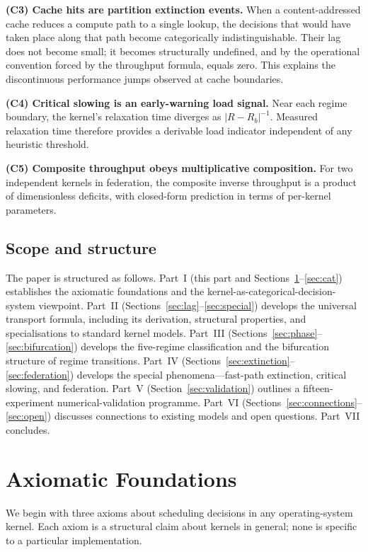 \documentclass[twocolumn,11pt,a4paper]{article}
\newcommand{\Rens}{R}
\begin{document}
\textbf{(C3) Cache hits are partition extinction events.} When a content-addressed cache reduces a compute path to a single lookup, the decisions that would have taken place along that path become categorically indistinguishable. Their lag does not become small; it becomes structurally undefined, and by the operational convention forced by the throughput formula, equals zero. This explains the discontinuous performance jumps observed at cache boundaries.

\textbf{(C4) Critical slowing is an early-warning load signal.} Near each regime boundary, the kernel's relaxation time diverges as $|\Rens - \Rens_b|^{-1}$. Measured relaxation time therefore provides a derivable load indicator independent of any heuristic threshold.

\textbf{(C5) Composite throughput obeys multiplicative composition.} For two independent kernels in federation, the composite inverse throughput is a product of dimensionless deficits, with closed-form prediction in terms of per-kernel parameters.

\subsection{Scope and structure}

The paper is structured as follows. Part~I (this part and Sections~\ref{sec:axioms}--\ref{sec:cat}) establishes the axiomatic foundations and the kernel-as-categorical-decision-system viewpoint. Part~II (Sections~\ref{sec:lag}--\ref{sec:special}) develops the universal transport formula, including its derivation, structural properties, and specialisations to standard kernel models. Part~III (Sections~\ref{sec:phase}--\ref{sec:bifurcation}) develops the five-regime classification and the bifurcation structure of regime transitions. Part~IV (Sections~\ref{sec:extinction}--\ref{sec:federation}) develops the special phenomena---fast-path extinction, critical slowing, and federation. Part~V (Section~\ref{sec:validation}) outlines a fifteen-experiment numerical-validation programme. Part~VI (Sections~\ref{sec:connections}--\ref{sec:open}) discusses connections to existing models and open questions. Part~VII concludes.

\section{Axiomatic Foundations}
\label{sec:axioms}

We begin with three axioms about scheduling decisions in any operating-system kernel. Each axiom is a structural claim about kernels in general; none is specific to a particular implementation.
\end{document}
